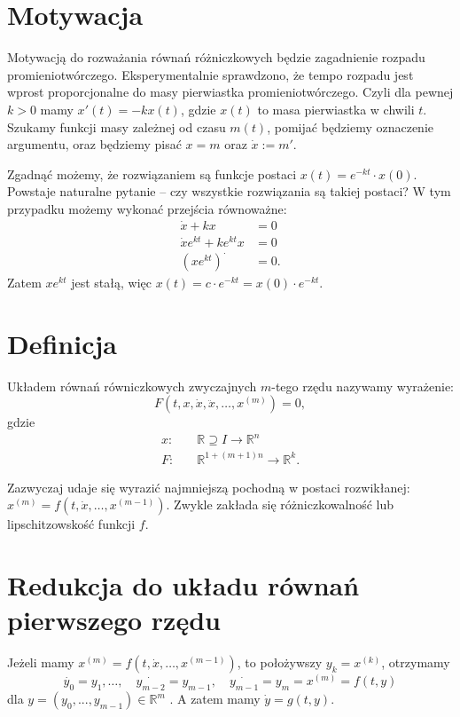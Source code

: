 \section{Motywacja}


Motywacją do rozważania równań różniczkowych będzie zagadnienie rozpadu promieniotwórczego.
Eksperymentalnie sprawdzono, że tempo rozpadu jest wprost proporcjonalne do masy pierwiastka promieniotwórczego.
Czyli dla pewnej $k>0$ mamy $x'(t)=-kx(t)$, gdzie $x\left(t \right) $ to masa pierwiastka w chwili $t$.
Szukamy funkcji masy zależnej od czasu $m(t)$, pomijać będziemy oznaczenie argumentu, oraz będziemy pisać $x = m$ oraz $\dot{x}:=m'$. 

Zgadnąć możemy, że rozwiązaniem są funkcje postaci $x\left( t \right) = e^{-kt}\cdot x\left( 0 \right) $. Powstaje naturalne pytanie -- czy wszystkie rozwiązania są takiej postaci? W tym przypadku możemy wykonać przejścia równoważne:
\begin{align*}
	\dot{x}+kx&=0\\
	\dot{x}e^{kt}+ke^{kt}x&=0\\
	\left( xe^{kt} \right) ^{\boldsymbol{\cdot}}&=0 
.\end{align*} Zatem $xe^{kt}$ jest stałą, więc $x\left( t \right) =c\cdot e^{-kt} = x(0)\cdot e^{-kt}$. 

\section{Definicja}
Układem równań równiczkowych zwyczajnych $m$-tego rzędu nazywamy wyrażenie: \[
	F\left(t,x,\dot{x},\ddot{x},\ldots,x^{(m)}\right)=0 
,\] gdzie 
\begin{align*}
	x: & \quad\mathbb{R}\supseteq I \to \mathbb{R}^{n}\\
	F:&  \quad\mathbb{R}^{1+\left( m+1 \right) n} \to \mathbb{R}^{k}
.\end{align*}

Zazwyczaj udaje się wyrazić najmniejszą pochodną w postaci rozwikłanej: $x^{\left( m \right) }=f\left( t, \dot{x}, \ldots, x^{\left( m-1 \right) } \right) $. Zwykle zakłada się różniczkowalność lub lipschitzowskość funkcji $f$. 

\section{Redukcja do układu równań pierwszego rzędu}

Jeżeli mamy $x^{\left( m \right) }=f\left(t,\dot{x},\ldots,x^{\left( m-1 \right) }\right)$, to położywszy $y_{k}=x^{(k)}$, otrzymamy $$\dot{y_{0}} = y_1, \ldots, \quad \dot{y_{m-2}}=y_{m-1}, \quad \dot{y_{m-1}}=y_m=x^{\left( m \right) }=f\left( t,y \right) $$ dla $y=\left( y_0,...,y_{m-1} \right) \in \mathbb{R}^{m}$ . 
A zatem mamy $\dot{y} = g\left( t,y \right) $.
